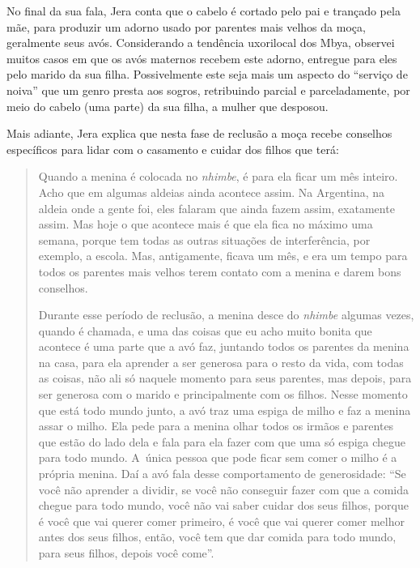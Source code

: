No final da sua fala, Jera conta que o cabelo é cortado pelo pai e
trançado pela mãe, para produzir um adorno usado por parentes mais
velhos da moça, geralmente seus avós. Considerando a tendência
uxorilocal dos Mbya, observei muitos casos em que os avós maternos
recebem este adorno, entregue para eles pelo marido da sua filha.
Possivelmente este seja mais um aspecto do ``serviço de noiva'' que um
genro presta aos sogros, retribuindo parcial e parceladamente, por meio
do cabelo (uma parte) da sua filha, a mulher que desposou. 

Mais adiante, Jera explica que nesta fase de reclusão a moça recebe
conselhos específicos para lidar com o casamento e cuidar dos filhos
que terá: 

\begin{quote}
\noindent
Quando a menina é colocada no \emph{nhimbe}, é para ela ficar um mês inteiro.
Acho que em algumas aldeias ainda acontece assim. Na Argentina, na
aldeia onde a gente foi, eles falaram que ainda fazem assim, exatamente
assim. Mas hoje o que acontece mais é que ela fica no máximo uma
semana, porque tem todas as outras situações de interferência, por
exemplo, a escola. Mas, antigamente, ficava um mês, e era um tempo para
todos os parentes mais velhos terem contato com a menina e darem bons
conselhos. 

\noindent
Durante esse período de reclusão, a menina desce do \emph{nhimbe} algumas
vezes, quando é chamada, e uma das coisas que eu acho muito bonita que
acontece é uma parte que a avó faz, juntando todos os parentes da
menina na casa, para ela aprender a ser generosa para o resto da vida,
com todas as coisas, não ali só naquele momento para seus parentes, mas
depois, para ser generosa com o marido e principalmente com os filhos.
Nesse momento que está todo mundo junto, a avó traz uma espiga de milho
e faz a menina assar o milho. Ela pede para a menina olhar todos os
irmãos e parentes que estão do lado dela e fala para ela fazer com que
uma só espiga chegue para todo mundo. A~única pessoa que pode ficar sem
comer o milho é a própria menina. Daí a avó fala desse comportamento de
generosidade: ``Se você não aprender a dividir, se você não conseguir
fazer com que a comida chegue para todo mundo, você não vai saber
cuidar dos seus filhos, porque é você que vai querer comer primeiro, é
você que vai querer comer melhor antes dos seus filhos, então, você tem
que dar comida para todo mundo, para seus filhos, depois você come''. 
\end{quote}

